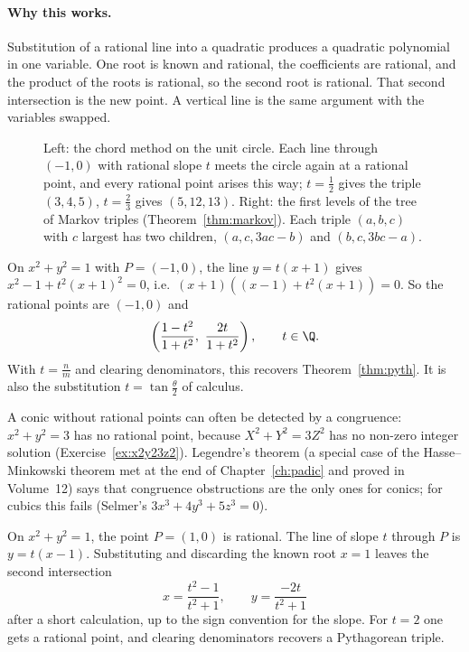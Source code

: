 \paragraph{Why this works.}
Substitution of a rational line into a quadratic produces a quadratic polynomial in one variable. One root is known and rational, the coefficients are rational, and the product of the roots is rational, so the second root is rational. That second intersection is the new point. A vertical line is the same argument with the variables swapped.

\begin{figure}[ht]
\centering
{}
\caption{Left: the chord method on the unit circle. Each line through $(-1,0)$ with rational slope $t$ meets the circle again at a rational point, and every rational point arises this way; $t=\frac12$ gives the triple $(3,4,5)$, $t=\frac23$ gives $(5,12,13)$. Right: the first levels of the tree of Markov triples (Theorem~\ref{thm:markov}). Each triple $(a,b,c)$ with $c$ largest has two children, $(a,c,3ac-b)$ and $(b,c,3bc-a)$.}
\label{fig:chordmarkov}
\end{figure}

\begin{example}
On $x^2+y^2=1$ with $P=(-1,0)$, the line $y=t(x+1)$ gives $x^2-1+t^2(x+1)^2=0$, i.e.\ $(x+1)\left((x-1)+t^2(x+1)\right)=0$. So the rational points are $(-1,0)$ and
\[
\left(\frac{1-t^2}{1+t^2},\ \frac{2t}{1+t^2}\right),\qquad t\in\Q.
\]
With $t=\frac nm$ and clearing denominators, this recovers Theorem~\ref{thm:pyth}. It is also the substitution $t=\tan\frac\theta2$ of calculus.
\end{example}

A conic without rational points can often be detected by a congruence: $x^2+y^2=3$ has no rational point, because $X^2+Y^2=3Z^2$ has no non-zero integer solution (Exercise~\ref{ex:x2y23z2}). Legendre's theorem (a special case of the Hasse--Minkowski theorem met at the end of Chapter~\ref{ch:padic} and proved in Volume~12) says that congruence obstructions are the only ones for conics; for cubics this fails (Selmer's $3x^3+4y^3+5z^3=0$).

\begin{examplex}
On $x^2+y^2=1$, the point $P=(1,0)$ is rational. The line of slope $t$ through $P$ is $y=t(x-1)$. Substituting and discarding the known root $x=1$ leaves the second intersection
\[
x=\frac{t^2-1}{t^2+1},\qquad y=\frac{-2t}{t^2+1}
\]
after a short calculation, up to the sign convention for the slope. For $t=2$ one gets a rational point, and clearing denominators recovers a Pythagorean triple.
\end{examplex}

